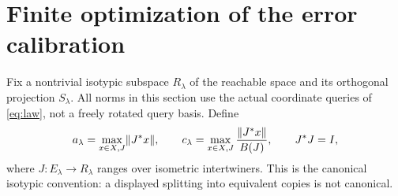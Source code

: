 \section{Finite optimization of the error calibration}\label{sec:calibration}
Fix a nontrivial isotypic subspace $R_\lambda$ of the reachable space and its orthogonal projection $S_\lambda$. All norms in this section use the actual coordinate queries of \eqref{eq:law}, not a freely rotated query basis. Define
\begin{equation}\label{eq:activation}
 a_\lambda=\max_{x\in X,J}\lVert J^*x\rVert,\qquad
 c_\lambda=\max_{x\in X,J}\frac{\lVert J^*x\rVert}{B(J)},
 \qquad J^*J=I,
\end{equation}
where $J:E_\lambda\to R_\lambda$ ranges over isometric intertwiners. This is the canonical isotypic convention: a displayed splitting into equivalent copies is not canonical.

